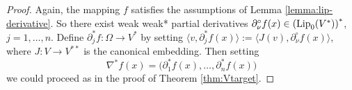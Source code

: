 \documentclass[reqno]{amsart}
\begin{document}
\begin{proof}
Again, the mapping $f$ satisfies the assumptions of Lemma \ref{lemma:lip-derivative}.
So there exist weak weak* partial derivatives  $\partial^\circ_\nu f(x)\in\left(\textnormal{Lip}_{0}(V^*)\right)^*$, $j=1,\dots, n$.
Define $\partial^{*}_j f:\Omega\to V^{*}$
by setting $\langle v, \partial^{*}_j f(x)\rangle := \langle J(v), \partial^\circ_\nu f(x) \rangle$, where $J:V\to V^{**}$ is the canonical embedding.
Then setting 
\[
\nabla^{*}f(x) = \big(\partial^{*}_{1}f(x), \dots, \partial^{*}_{n}f(x) \big)
\]
we could proceed as in the proof of Theorem \ref{thm:Vtarget}.

\end{proof}




\end{document}

